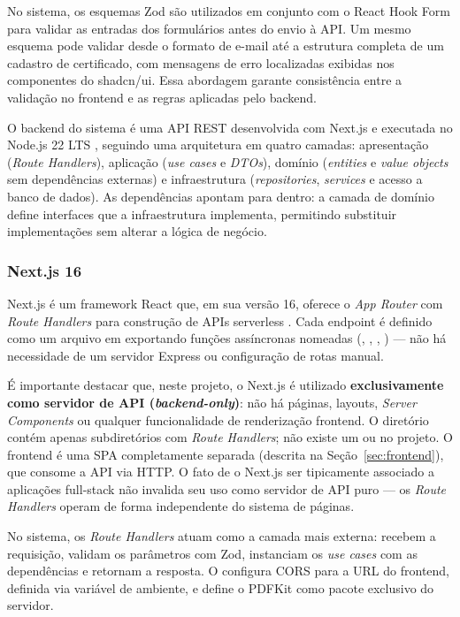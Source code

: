 No sistema, os esquemas Zod são utilizados em conjunto com o React Hook Form para validar as entradas dos formulários antes do envio à API. Um mesmo esquema pode validar desde o formato de e-mail até a estrutura completa de um cadastro de certificado, com mensagens de erro localizadas exibidas nos componentes  do shadcn/ui. Essa abordagem garante consistência entre a validação no frontend e as regras aplicadas pelo backend.

\label{sec:backend}

O backend do sistema é uma API REST desenvolvida com Next.js e executada no Node.js 22 LTS \cite{nodejs2025}, seguindo uma arquitetura em quatro camadas: apresentação (\textit{Route Handlers}), aplicação (\textit{use cases} e \textit{DTOs}), domínio (\textit{entities} e \textit{value objects} sem dependências externas) e infraestrutura (\textit{repositories}, \textit{services} e acesso a banco de dados). As dependências apontam para dentro: a camada de domínio define interfaces que a infraestrutura implementa, permitindo substituir implementações sem alterar a lógica de negócio.

\subsubsection{Next.js 16}
Next.js é um framework React que, em sua versão 16, oferece o \textit{App Router} com \textit{Route Handlers} para construção de APIs serverless \cite{nextjs2025}. Cada endpoint é definido como um arquivo em  exportando funções assíncronas nomeadas (, , , ) --- não há necessidade de um servidor Express ou configuração de rotas manual.

É importante destacar que, neste projeto, o Next.js é utilizado \textbf{exclusivamente como servidor de API (\textit{backend-only})}: não há páginas, layouts, \textit{Server Components} ou qualquer funcionalidade de renderização frontend. O diretório  contém apenas subdiretórios  com \textit{Route Handlers}; não existe um  ou  no projeto. O frontend é uma SPA completamente separada (descrita na Seção~\ref{sec:frontend}), que consome a API via HTTP. O fato de o Next.js ser tipicamente associado a aplicações full-stack não invalida seu uso como servidor de API puro --- os \textit{Route Handlers} operam de forma independente do sistema de páginas.

No sistema, os \textit{Route Handlers} atuam como a camada mais externa: recebem a requisição, validam os parâmetros com Zod, instanciam os \textit{use cases} com as dependências e retornam a resposta. O  configura CORS para a URL do frontend, definida via variável de ambiente, e define o PDFKit como pacote exclusivo do servidor.

